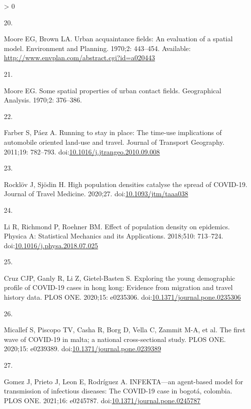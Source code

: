 \documentclass[10pt,letterpaper]{article}
\newlength{\csllabelwidth}
\newlength{\cslhangindent}
\newenvironment{CSLReferences}[3] %
 {%
  \setlength{\parindent}{0pt}
  \ifodd #1 \everypar{\setlength{\hangindent}{\cslhangindent}}\ignorespaces\fi
  \ifnum #2 > 0
  \setlength{\parskip}{#2\baselineskip}
  \fi
 }%
 {}
\newcommand{\CSLLeftMargin}[1]{\parbox[t]{\csllabelwidth}{#1}}
\newcommand{\CSLRightInline}[1]{\parbox[t]{\linewidth - \csllabelwidth}{#1}}
\begin{document}
\begin{CSLReferences}{0}{0}
\leavevmode\hypertarget{ref-Moore1970urban}{}%
\CSLLeftMargin{20. }
\CSLRightInline{Moore EG, Brown LA. Urban acquaintance fields: An
evaluation of a spatial model. Environment and Planning. 1970;2:
443--454. Available:
\url{http://www.envplan.com/abstract.cgi?id=a020443}}

\leavevmode\hypertarget{ref-Moore1970some}{}%
\CSLLeftMargin{21. }
\CSLRightInline{Moore EG. Some spatial properties of urban contact
fields. Geographical Analysis. 1970;2: 376--386. }

\leavevmode\hypertarget{ref-Farber2011running}{}%
\CSLLeftMargin{22. }
\CSLRightInline{Farber S, Páez A. Running to stay in place: The time-use
implications of automobile oriented land-use and travel. Journal of
Transport Geography. 2011;19: 782--793.
doi:\href{https://doi.org/10.1016/j.jtrangeo.2010.09.008}{10.1016/j.jtrangeo.2010.09.008}}

\leavevmode\hypertarget{ref-Rocklov2020high}{}%
\CSLLeftMargin{23. }
\CSLRightInline{Rocklöv J, Sjödin H. High population densities catalyse
the spread of COVID-19. Journal of Travel Medicine. 2020;27.
doi:\href{https://doi.org/10.1093/jtm/taaa038}{10.1093/jtm/taaa038}}

\leavevmode\hypertarget{ref-Li2018effect}{}%
\CSLLeftMargin{24. }
\CSLRightInline{Li R, Richmond P, Roehner BM. Effect of population
density on epidemics. Physica A: Statistical Mechanics and its
Applications. 2018;510: 713--724.
doi:\href{https://doi.org/10.1016/j.physa.2018.07.025}{10.1016/j.physa.2018.07.025}}

\leavevmode\hypertarget{ref-Cruz2020exploring}{}%
\CSLLeftMargin{25. }
\CSLRightInline{Cruz CJP, Ganly R, Li Z, Gietel-Basten S. Exploring the
young demographic profile of COVID-19 cases in hong kong: Evidence from
migration and travel history data. PLOS ONE. 2020;15: e0235306.
doi:\href{https://doi.org/10.1371/journal.pone.0235306}{10.1371/journal.pone.0235306}}

\leavevmode\hypertarget{ref-Micallef2020first}{}%
\CSLLeftMargin{26. }
\CSLRightInline{Micallef S, Piscopo TV, Casha R, Borg D, Vella C, Zammit
M-A, et al. The first wave of COVID-19 in malta; a national
cross-sectional study. PLOS ONE. 2020;15: e0239389.
doi:\href{https://doi.org/10.1371/journal.pone.0239389}{10.1371/journal.pone.0239389}}

\leavevmode\hypertarget{ref-Gomez2021infekta}{}%
\CSLLeftMargin{27. }
\CSLRightInline{Gomez J, Prieto J, Leon E, Rodríguez A. INFEKTA---an
agent-based model for transmission of infectious diseases: The COVID-19
case in bogotá, colombia. PLOS ONE. 2021;16: e0245787.
doi:\href{https://doi.org/10.1371/journal.pone.0245787}{10.1371/journal.pone.0245787}}


\end{CSLReferences}
\end{document}
